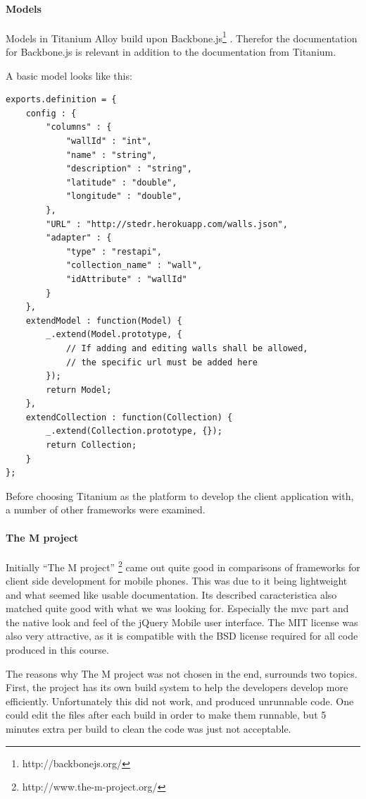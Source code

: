 \documentclass[11pt]{book}
\begin{document}
\paragraph{Models}
Models in Titanium Alloy build upon Backbone.js\footnote{http://backbonejs.org/} \cite{titaniumAlloyModel}. Therefor the documentation for Backbone.js is relevant in addition to the documentation from Titanium.

A basic model looks like this:
\begin{lstlisting}[frame=single]
exports.definition = {
    config : {
        "columns" : {
            "wallId" : "int",
            "name" : "string",
            "description" : "string",
            "latitude" : "double",
            "longitude" : "double",
        },
        "URL" : "http://stedr.herokuapp.com/walls.json",
        "adapter" : {
            "type" : "restapi",
            "collection_name" : "wall",
            "idAttribute" : "wallId"
        }
    },
    extendModel : function(Model) {
        _.extend(Model.prototype, {
            // If adding and editing walls shall be allowed,
            // the specific url must be added here
        });
        return Model;
    },
    extendCollection : function(Collection) {
        _.extend(Collection.prototype, {});
        return Collection;
    }
};
\end{lstlisting}

Before choosing Titanium as the platform to develop the client application with, a number of other frameworks were examined.

\paragraph{The M project}
Initially “The M project” \footnote{http://www.the-m-project.org/} came out quite good in comparisons of frameworks for client side development for mobile phones. This was due to it being lightweight and what seemed like usable documentation. Its described caracteristica also matched quite good with what we was looking for. Especially the \gls{mvc} part and the native look and feel of the jQuery Mobile user interface. The MIT license was also very attractive, as it is compatible with the BSD license required for all code produced in this course.

The reasons why The M project was not chosen in the end, surrounds two topics. First, the project has its own build system to help the developers develop more efficiently. Unfortunately this did not work, and produced unrunnable code. One could edit the files after each build in order to make them runnable, but 5 minutes extra per build to clean the code was just not acceptable.
\end{document}
